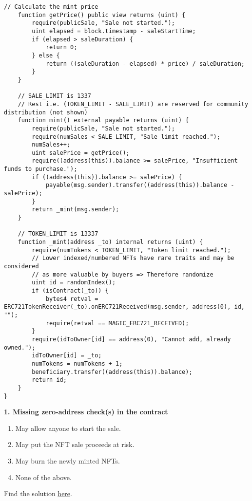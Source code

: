 \begin{lstlisting}[language=Solidity, style=solStyle]
    // Calculate the mint price
    function getPrice() public view returns (uint) {
        require(publicSale, "Sale not started.");
        uint elapsed = block.timestamp - saleStartTime;
        if (elapsed > saleDuration) {
            return 0;
        } else {
            return ((saleDuration - elapsed) * price) / saleDuration;
        }
    }
    
    // SALE_LIMIT is 1337 
    // Rest i.e. (TOKEN_LIMIT - SALE_LIMIT) are reserved for community distribution (not shown)
    function mint() external payable returns (uint) {
        require(publicSale, "Sale not started.");
        require(numSales < SALE_LIMIT, "Sale limit reached.");
        numSales++;
        uint salePrice = getPrice();
        require((address(this)).balance >= salePrice, "Insufficient funds to purchase.");
        if ((address(this)).balance >= salePrice) {
            payable(msg.sender).transfer((address(this)).balance - salePrice);
        }
        return _mint(msg.sender);
    }

    // TOKEN_LIMIT is 13337
    function _mint(address _to) internal returns (uint) {
        require(numTokens < TOKEN_LIMIT, "Token limit reached.");
        // Lower indexed/numbered NFTs have rare traits and may be considered
        // as more valuable by buyers => Therefore randomize
        uint id = randomIndex();
        if (isContract(_to)) {
            bytes4 retval = ERC721TokenReceiver(_to).onERC721Received(msg.sender, address(0), id, "");
            require(retval == MAGIC_ERC721_RECEIVED);
        }
        require(idToOwner[id] == address(0), "Cannot add, already owned.");
        idToOwner[id] = _to;
        numTokens = numTokens + 1;
        beneficiary.transfer((address(this)).balance);
        return id;
    }
}
\end{lstlisting}

\textbf{1. Missing zero-address check(s) in the contract}

\begin{enumerate}[label=\Alph*.]
\item May allow anyone to start the sale.
\item May put the NFT sale proceeds at risk.
\item May burn the newly minted NFTs.
\item None of the above.
\end{enumerate}

Find the solution \hyperref[sec:exam8_q1]{here}.\\

